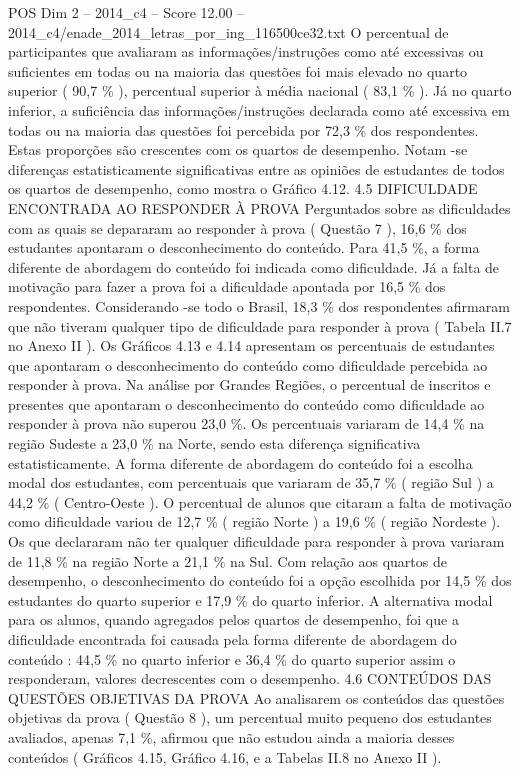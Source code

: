 \begin{textsample}{POS Dim 2 – 2014\_c4 – Score 12.00 – 2014\_c4/enade\_2014\_letras\_por\_ing\_116500ce32.txt}
O percentual de participantes que avaliaram as informações/instruções como até excessivas ou suficientes em todas ou na maioria das questões foi mais elevado no quarto superior ( 90,7 \% ), percentual superior à média nacional ( 83,1 \% ).
Já no quarto inferior, a suficiência das informações/instruções declarada como até excessiva em todas ou na maioria das questões foi percebida por 72,3 \% dos respondentes.
Estas proporções são crescentes com os quartos de desempenho.
Notam -se diferenças estatisticamente significativas entre as opiniões de estudantes de todos os quartos de desempenho, como mostra o Gráfico 4.12. 4.5 DIFICULDADE ENCONTRADA AO RESPONDER À PROVA Perguntados sobre as dificuldades com as quais se depararam ao responder à prova ( Questão 7 ), 16,6 \% dos estudantes apontaram o desconhecimento do conteúdo.
Para 41,5 \%, a forma diferente de abordagem do conteúdo foi indicada como dificuldade.
Já a falta de motivação para fazer a prova foi a dificuldade apontada por 16,5 \% dos respondentes.
Considerando -se todo o Brasil, 18,3 \% dos respondentes afirmaram que não tiveram qualquer tipo de dificuldade para responder à prova ( Tabela II.7 no Anexo II ).
Os Gráficos 4.13 e 4.14 apresentam os percentuais de estudantes que apontaram o desconhecimento do conteúdo como dificuldade percebida ao responder à prova.
Na análise por Grandes Regiões, o percentual de inscritos e presentes que apontaram o desconhecimento do conteúdo como dificuldade ao responder à prova não superou 23,0 \%.
Os percentuais variaram de 14,4 \% na região Sudeste a 23,0 \% na Norte, sendo esta diferença significativa estatisticamente.
A forma diferente de abordagem do conteúdo foi a escolha modal dos estudantes, com percentuais que variaram de 35,7 \% ( região Sul ) a 44,2 \% ( Centro-Oeste ).
O percentual de alunos que citaram a falta de motivação como dificuldade variou de 12,7 \% ( região Norte ) a 19,6 \% ( região Nordeste ).
Os que declararam não ter qualquer dificuldade para responder à prova variaram de 11,8 \% na região Norte a 21,1 \% na Sul.
Com relação aos quartos de desempenho, o desconhecimento do conteúdo foi a opção escolhida por 14,5 \% dos estudantes do quarto superior e 17,9 \% do quarto inferior.
A alternativa modal para os alunos, quando agregados pelos quartos de desempenho, foi que a dificuldade encontrada foi causada pela forma diferente de abordagem do conteúdo : 44,5 \% no quarto inferior e 36,4 \% do quarto superior assim o responderam, valores decrescentes com o desempenho. 4.6 CONTEÚDOS DAS QUESTÕES OBJETIVAS DA PROVA Ao analisarem os conteúdos das questões objetivas da prova ( Questão 8 ), um percentual muito pequeno dos estudantes avaliados, apenas 7,1 \%, afirmou que não estudou ainda a maioria desses conteúdos ( Gráficos 4.15, Gráfico 4.16, e a Tabelas II.8 no Anexo II ).

\end{textsample}
